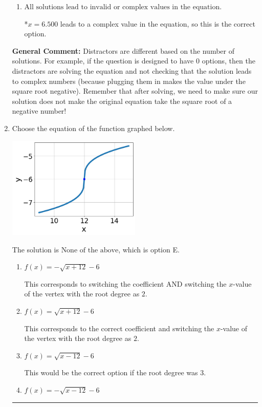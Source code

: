 \documentclass{extbook}[14pt]
\newcommand{\litem}[1]{\item #1

\rule{\textwidth}{0.4pt}}
\begin{document}
\begin{enumerate}
{\begin{enumerate}[label=\Alph*.]
$x = -1.600$ and $x = 0.714$, which corresponds to solving each radical separately for 0.
\item \( \text{All solutions lead to invalid or complex values in the equation.} \)

*$x = 6.500$ leads to a complex value in the equation, so this is the correct option.
\end{enumerate}

\textbf{General Comment:} Distractors are different based on the number of solutions. For example, if the question is designed to have 0 options, then the distractors are solving the equation and not checking that the solution leads to complex numbers (because plugging them in makes the value under the square root negative). Remember that after solving, we need to make sure our solution does not make the original equation take the square root of a negative number!
}
\litem{
Choose the equation of the function graphed below.

\begin{center}
    \includegraphics[width=0.5\textwidth]{../Figures/radicalGraphToEquationCopyC.png}
\end{center}


The solution is \( \text{None of the above} \), which is option E.\begin{enumerate}[label=\Alph*.]
\item \( f(x) = - \sqrt{x + 12} - 6 \)

This corresponds to switching the coefficient AND switching the $x$-value of the vertex with the root degree as $2$.
\item \( f(x) = \sqrt{x + 12} - 6 \)

This corresponds to the correct coefficient and switching the $x$-value of the vertex with the root degree as $2$.
\item \( f(x) = \sqrt{x - 12} - 6 \)

This would be the correct option if the root degree was $3$.
\item \( f(x) = - \sqrt{x - 12} - 6 \)


\end{enumerate}}
\end{enumerate}
\end{document}
